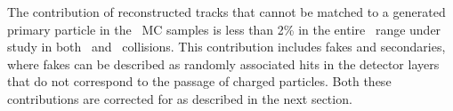 The contribution of reconstructed tracks that cannot be matched to a generated primary particle in the \pp\ MC samples is less than 2\% in the entire \pttrk\ range under study in both \pp\ and \pbpb\ collisions.
This contribution includes fakes and secondaries, where  fakes can be described as randomly associated hits in the detector layers that do not correspond to the passage of charged particles.
Both these contributions are corrected for as described in the next section.








